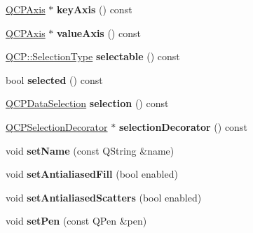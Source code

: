 \begin{DoxyCompactItemize}
\hyperlink{class_q_c_p_axis}{Q\+C\+P\+Axis} $\ast$ {\bfseries key\+Axis} () const
\item 
\mbox{\label{class_q_c_p_abstract_plottable_af47809a644a68ffd955fb30b01fb4f2f}} 
\hyperlink{class_q_c_p_axis}{Q\+C\+P\+Axis} $\ast$ {\bfseries value\+Axis} () const
\item 
\mbox{\label{class_q_c_p_abstract_plottable_a016653741033bd332d1d4c3c725cc284}} 
\hyperlink{namespace_q_c_p_ac6cb9db26a564b27feda362a438db038}{Q\+C\+P\+::\+Selection\+Type} {\bfseries selectable} () const
\item 
\mbox{\label{class_q_c_p_abstract_plottable_a0b3b514474fe93354fc74cfc144184b4}} 
bool {\bfseries selected} () const
\item 
\mbox{\label{class_q_c_p_abstract_plottable_a040bf09f41d456284cfd39cc37aa068f}} 
\hyperlink{class_q_c_p_data_selection}{Q\+C\+P\+Data\+Selection} {\bfseries selection} () const
\item 
\mbox{\label{class_q_c_p_abstract_plottable_a1279d00e9409843740b9ec33796f0757}} 
\hyperlink{class_q_c_p_selection_decorator}{Q\+C\+P\+Selection\+Decorator} $\ast$ {\bfseries selection\+Decorator} () const
\item 
\mbox{\label{class_q_c_p_abstract_plottable_ab79c7ba76bc7fa89a4b3580e12149f1f}} 
void {\bfseries set\+Name} (const Q\+String \&name)
\item 
\mbox{\label{class_q_c_p_abstract_plottable_a089d6b5577120239b55c39ed27c39536}} 
void {\bfseries set\+Antialiased\+Fill} (bool enabled)
\item 
\mbox{\label{class_q_c_p_abstract_plottable_a2f03f067ede2ed4da6f7d0e4777a3f02}} 
void {\bfseries set\+Antialiased\+Scatters} (bool enabled)
\item 
\mbox{\label{class_q_c_p_abstract_plottable_ab74b09ae4c0e7e13142fe4b5bf46cac7}} 
void {\bfseries set\+Pen} (const Q\+Pen \&pen)

\end{DoxyCompactItemize}
